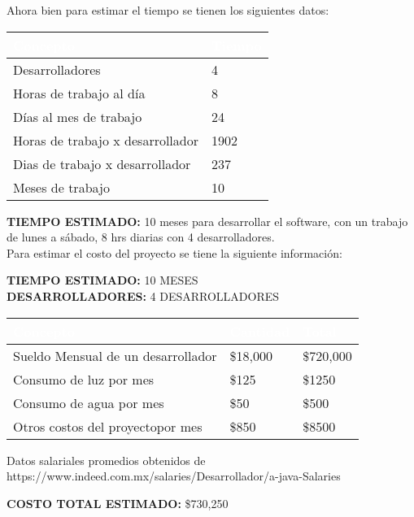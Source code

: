 Ahora bien para estimar el tiempo se tienen los siguientes datos:

\begin{table}[H]
	\centering
	\begin{tabular}{|p{4cm}|p{4cm}|}
		\hline
		\rowcolor{black} \textcolor{white} {\textbf{Concepto}} & \textcolor{white}{\textbf{Tiempo}} \\ \hline
		Desarrolladores & 4  \\
		\hline
		Horas de trabajo al día & 8  \\
		\hline
		Días al mes de trabajo & 24  \\
		\hline
		Horas de trabajo x desarrollador & 1902  \\
		\hline
		Dias de trabajo x desarrollador & 237  \\
		\hline
		Meses de trabajo  & 10  \\
		\hline
	\end{tabular}
\end{table}

\textbf {TIEMPO ESTIMADO:} 10 meses para desarrollar el software, con un trabajo de lunes a sábado, 8 hrs diarias con 4 desarrolladores.\\

Para estimar el costo del proyecto se tiene la siguiente información:

\textbf {TIEMPO ESTIMADO:} 10 MESES \\
\textbf {DESARROLLADORES:} 4 DESARROLLADORES\\

\begin{table}[H]
	\centering
	\begin{tabular}{|p{4cm}|p{4cm}|p{4cm}|}
		\hline
		\rowcolor{black} \textcolor{white} {\textbf{Concepto}} & \textcolor{white}{\textbf{Cantidad}} & \textcolor{white}{\textbf{Total}} \\ \hline
		Sueldo Mensual de un desarrollador & \$18,000 & \$720,000   \\
		\hline
		Consumo de luz por mes & \$125  & \$1250 \\
		\hline
		Consumo de agua por mes & \$50  & \$500  \\
		\hline
		Otros costos del proyectopor mes & \$850  & \$8500  \\
		\hline
	\end{tabular}
\end{table}

Datos salariales promedios obtenidos de https://www.indeed.com.mx/salaries/Desarrollador/a-java-Salaries

\textbf {COSTO TOTAL ESTIMADO:} \$730,250  \\
